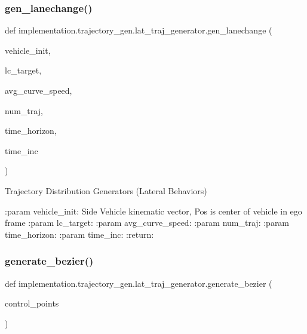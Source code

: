 \subsubsection{\texorpdfstring{gen\+\_\+lanechange()}{gen\_lanechange()}}
{\footnotesize\ttfamily def implementation.\+trajectory\+\_\+gen.\+lat\+\_\+traj\+\_\+generator.\+gen\+\_\+lanechange (\begin{DoxyParamCaption}\item[{}]{vehicle\+\_\+init,  }\item[{}]{lc\+\_\+target,  }\item[{}]{avg\+\_\+curve\+\_\+speed,  }\item[{}]{num\+\_\+traj,  }\item[{}]{time\+\_\+horizon,  }\item[{}]{time\+\_\+inc }\end{DoxyParamCaption})}



Trajectory Distribution Generators (Lateral Behaviors) 

\begin{DoxyVerb}:param vehicle_init: Side Vehicle kinematic vector, Pos is center of vehicle in ego frame
:param lc_target:
:param avg_curve_speed:
:param num_traj:
:param time_horizon:
:param time_inc:
:return:
\end{DoxyVerb}
 \mbox{\label{namespaceimplementation_1_1trajectory__gen_1_1lat__traj__generator_a08f872c8f989fac4214e8b5f623a8c55}} 
\subsubsection{\texorpdfstring{generate\+\_\+bezier()}{generate\_bezier()}}
{\footnotesize\ttfamily def implementation.\+trajectory\+\_\+gen.\+lat\+\_\+traj\+\_\+generator.\+generate\+\_\+bezier (\begin{DoxyParamCaption}\item[{}]{control\+\_\+points }\end{DoxyParamCaption})}

